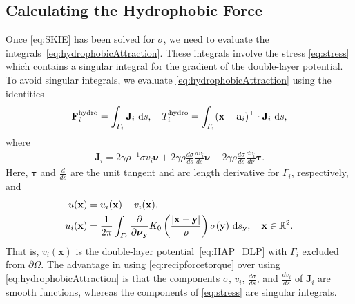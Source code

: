 \documentclass[lineno]{jfm}
\renewcommand{\aa}{\mathbf{a}}
\newcommand{\bd}{\partial}
\newcommand{\FF}{\mathbf{F}}
\newcommand{\JJ}{\mathbf{J}}
\newcommand{\nnu}{\boldsymbol{\nu}}
\newcommand{\ttau}{\boldsymbol{\tau}}
\newcommand{\xx}{\mathbf{x}}
\newcommand{\yy}{\mathbf{y}}
\newcommand{\pderiv}[2]{\frac{\partial #1}{\partial #2}}
\begin{document}
\subsection{Calculating the Hydrophobic Force}
\label{subsec:calculating_force}
Once \eqref{eq:SKIE} has been solved for $\sigma$, we need to evaluate
the integrals~\eqref{eq:hydrophobicAttraction}. These integrals involve
the stress \eqref{eq:stress} which contains a singular integral for the
gradient of the double-layer potential. To avoid singular integrals, we
evaluate \eqref{eq:hydrophobicAttraction} using the identities
\begin{align}
  \label{eq:recipforcetorque}
  \FF_i^{\text{hydro}} = \int_{\Gamma_i} \JJ_i \,\dif s,\quad
  T_i^{\text{hydro}}    = \int_{\Gamma_i} 
    (\xx - \aa_i)^{\perp} \cdot \JJ_i  \,\dif s,
\end{align}
where
\begin{align}
  \label{eq:jumpstress1}
  \JJ_{i} = 2\gamma\rho^{-1} \sigma v_i \nnu + 
    2\gamma\rho \frac{d\sigma}{ds} \frac{dv_i}{ds} \nnu -
    2\gamma\rho \frac{d\sigma}{ds} \frac{dv_i}{d\nu} \ttau.
\end{align}
Here, $\ttau$ and $\frac{d}{ds}$ are the unit tangent  and arc length
derivative for $\Gamma_i$, respectively, and
\begin{equation}
\label{eq:uidef}
\begin{aligned}
    u(\xx) &= u_i(\xx) + v_i(\xx),\\
    u_i(\xx) &= \frac{1}{2\pi} \int_{\Gamma_i} \pderiv{}{\nnu_\yy}
    K_0 \left(\frac{|\xx - \yy|}{\rho}\right) \sigma(\yy) \, \dif s_\yy,
    \quad \xx \in \mathbb{R}^2.
\end{aligned}
\end{equation}
That is, $v_i(\xx)$ is the double-layer potential~\eqref{eq:HAP_DLP} with 
$\Gamma_i$ excluded from $\bd\Omega$. The advantage in
using \eqref{eq:recipforcetorque} over using \eqref{eq:hydrophobicAttraction} is that the components
$\sigma$, $v_i$, $\frac{d\sigma}{ds}$, and $\frac{dv_i}{ds}$ of $\JJ_i$ are smooth functions,
whereas the components of \eqref{eq:stress} are singular integrals.  
\end{document}
